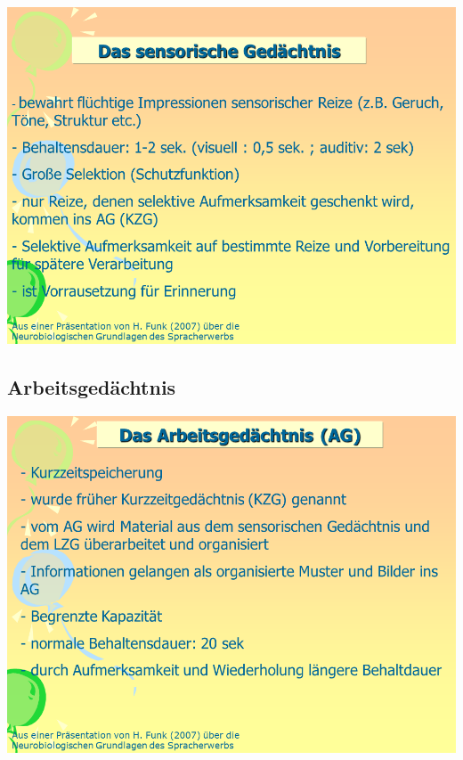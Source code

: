 \documentclass[
  letterpaper,
]{scrbook}
\begin{document}
\includegraphics[width=1\textwidth,height=\textheight]{./pictures/neuro/Diapozitiv39.PNG}

\hypertarget{arbeitsgeduxe4chtnis}{%
\subsection{Arbeitsgedächtnis}\label{arbeitsgeduxe4chtnis}}

\includegraphics[width=1\textwidth,height=\textheight]{./pictures/neuro/Diapozitiv40.PNG}
\end{document}

